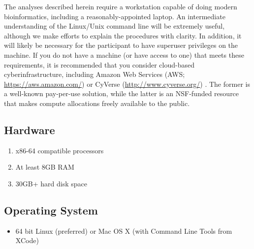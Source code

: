\documentclass[runningheads,a4paper]{llncs}
\begin{document}
\begin{linenumbers}
The analyses described herein require a workstation capable of doing modern bioinformatics, including a reasonably-appointed laptop.
An intermediate understanding of the Linux/Unix command line will be extremely useful, although we make efforts to explain the procedures with clarity. In addition, it will likely be necessary for the participant to have superuser privileges on the machine.
If you do not have a machine (or have access to one) that meets these requirements, it is recommended that you consider cloud-based cyberinfrastructure, including Amazon Web Services (AWS; \url{https://aws.amazon.com/}) or CyVerse (\url{http://www.cyverse.org/}) \cite{Merchant:2016jn}.
The former is a well-known pay-per-use solution, while the latter is an NSF-funded resource that makes compute allocations freely available to the public.

\subsection{Hardware}
\begin{enumerate} 
\item x86-64 compatible processors
\item At least 8GB RAM
\item 30GB+ hard disk space
\end{enumerate}

\subsection{Operating System}
\begin{itemize}
\item 64 bit Linux (preferred) or Mac OS X (with Command Line Tools from XCode)
\end{itemize}


\end{linenumbers}
\end{document}
